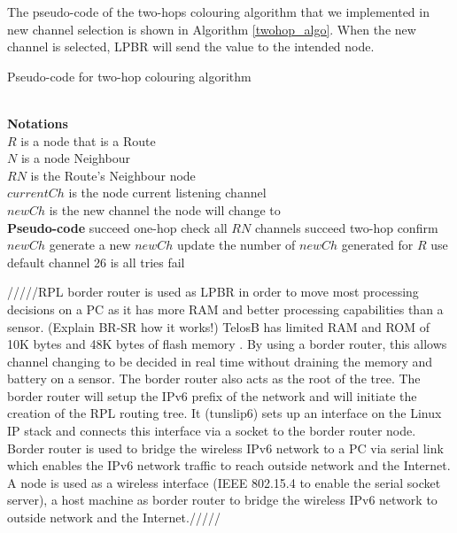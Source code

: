The pseudo-code of the two-hops colouring algorithm that we implemented in new channel selection is shown in Algorithm \ref{twohop_algo}. When the new channel is selected, LPBR will send the value to the intended node.

\begin{algorithm}
\caption{Pseudo-code for two-hop colouring algorithm}
\label{twohop_algo}
\begin{algorithmic}[]
\\\textbf{Notations}
\\$R$ is a node that is a Route
\\$N$ is a node Neighbour
\\$RN$ is the Route's Neighbour node
\\$currentCh$ is the node current listening channel
\\$newCh$ is the new channel the node will change to
\\\textbf{Pseudo-code}
		\State succeed one-hop
		\State check all $RN$ channels
			\State succeed two-hop
			\State confirm $newCh$
		\EndIf
	\Else
		\State generate a new $newCh$
		\State update the number of $newCh$ generated for $R$
		\State use default channel 26 is all tries fail
	\EndIf
\end{algorithmic}
\end{algorithm}

/////RPL border router is used as LPBR in order to move most processing decisions on a PC as it has more RAM and better processing capabilities than a sensor. (Explain BR-SR how it works!)
TelosB has limited RAM and ROM of 10K bytes and 48K bytes of flash memory \cite{telosb-datasheet}. By using a border router, this allows channel changing to be decided in real time without draining the memory and battery on a sensor. The border router also acts as the root of the tree. The border router will setup the IPv6 prefix of the network and will initiate the creation of the RPL routing tree.
It (tunslip6) sets up an interface on the Linux IP stack and connects this interface via a socket to the border router node.
Border router is used to bridge the wireless IPv6 network to a PC via serial link which enables the IPv6 network traffic to reach outside network and the Internet.
A node is used as a wireless interface (IEEE 802.15.4 to enable the serial socket server), a host machine as border router to bridge the wireless IPv6 network to outside network and the Internet./////

